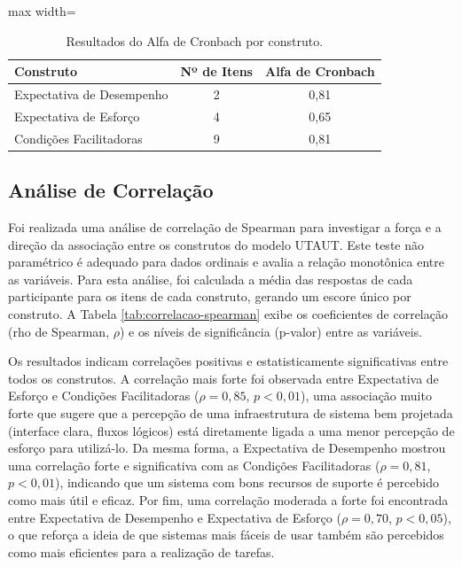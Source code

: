 \documentclass[portuguese]{sbc2025}%
\begin{document}
\begin{table}[h!]
    \centering
    \caption{Resultados do Alfa de Cronbach por construto.}
    \label{tab:cronbach-alpha}
    \begin{adjustbox}{max width=\columnwidth}
        \begin{tabular}{|l|c|c|}
            \hline
            \textbf{Construto} & \textbf{Nº de Itens} & \textbf{Alfa de Cronbach} \\
            \hline
            Expectativa de Desempenho & 2 & 0{,}81 \\
            Expectativa de Esforço    & 4 & 0{,}65 \\
            Condições Facilitadoras   & 9 & 0{,}81 \\
            \hline
        \end{tabular}
    \end{adjustbox}
\end{table}

\subsection{Análise de Correlação}
Foi realizada uma análise de correlação de Spearman para investigar a força e a direção da associação entre os construtos do modelo UTAUT. Este teste não paramétrico é adequado para dados ordinais e avalia a relação monotônica entre as variáveis. Para esta análise, foi calculada a média das respostas de cada participante para os itens de cada construto, gerando um escore único por construto. A Tabela \ref{tab:correlacao-spearman} exibe os coeficientes de correlação (rho de Spearman, $\rho$) e os níveis de significância (p-valor) entre as variáveis.

Os resultados indicam correlações positivas e estatisticamente significativas entre todos os construtos. A correlação mais forte foi observada entre Expectativa de Esforço e Condições Facilitadoras ($\rho = 0,85$, $p < 0,01$), uma associação muito forte que sugere que a percepção de uma infraestrutura de sistema bem projetada (interface clara, fluxos lógicos) está diretamente ligada a uma menor percepção de esforço para utilizá-lo. Da mesma forma, a Expectativa de Desempenho mostrou uma correlação forte e significativa com as Condições Facilitadoras ($\rho = 0,81$, $p < 0,01$), indicando que um sistema com bons recursos de suporte é percebido como mais útil e eficaz. Por fim, uma correlação moderada a forte foi encontrada entre Expectativa de Desempenho e Expectativa de Esforço ($\rho = 0,70$, $p < 0,05$), o que reforça a ideia de que sistemas mais fáceis de usar também são percebidos como mais eficientes para a realização de tarefas.
\end{document}
